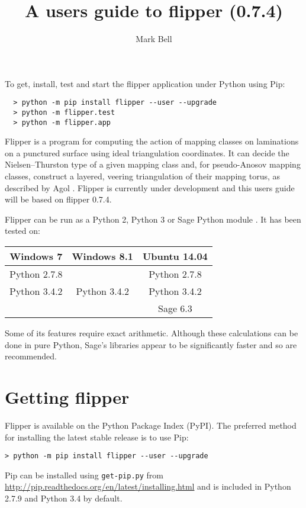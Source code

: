 \documentclass[a4paper]{article}
\title{A users guide to flipper (0.7.4)}
\author{Mark Bell}
\begin{document}
\maketitle

\begin{center}
\begin{minipage}{0.8\linewidth}
\begin{framed}
  To get, install, test and start the flipper application under Python using Pip:
  \begin{lstlisting}
  > python -m pip install flipper --user --upgrade
  > python -m flipper.test
  > python -m flipper.app
  \end{lstlisting}
\end{framed}
\end{minipage}
\end{center}

Flipper is a program for computing the action of mapping classes on laminations on a punctured surface using ideal triangulation coordinates. It can decide the Nielsen--Thurston type of a given mapping class and, for pseudo-Anosov mapping classes, construct a layered, veering triangulation of their mapping torus, as described by Agol \cite{Agol}. Flipper is currently under development and this users guide will be based on flipper 0.7.4.


Flipper can be run as a Python 2, Python 3 or Sage Python module \cite{sage}. It has been tested on:

\begin{center}
\begin{tabular}{c|c|c}
Windows 7 & Windows 8.1 & Ubuntu 14.04 \\
\hline
Python 2.7.8 & & Python 2.7.8 \\
Python 3.4.2 & Python 3.4.2 & Python 3.4.2 \\
 & & Sage 6.3 \\
\end{tabular}
\end{center}

Some of its features require exact arithmetic. Although these calculations can be done in pure Python, Sage's libraries appear to be significantly faster and so are recommended.

\section{Getting flipper}

Flipper is available on the Python Package Index (PyPI). The preferred method for installing the latest stable release is to use Pip:
\begin{lstlisting}
> python -m pip install flipper --user --upgrade
\end{lstlisting}
Pip can be installed using \texttt{get-pip.py} from \url{http://pip.readthedocs.org/en/latest/installing.html} and is included in Python 2.7.9 and Python 3.4 by default.
\end{document}
